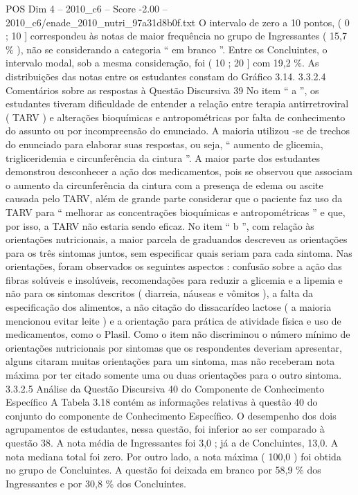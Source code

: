 \begin{textsample}{POS Dim 4 – 2010\_c6 – Score -2.00 – 2010\_c6/enade\_2010\_nutri\_97a31d8b0f.txt}
O intervalo de zero a 10 pontos, ( 0 ; 10 ] correspondeu às notas de maior frequência no grupo de Ingressantes ( 15,7 \% ), não se considerando a categoria “ em branco ”.
Entre os Concluintes, o intervalo modal, sob a mesma consideração, foi ( 10 ; 20 ] com 19,2 \%.
As distribuições das notas entre os estudantes constam do Gráfico 3.14. 3.3.2.4 Comentários sobre as respostas à Questão Discursiva 39 No item “ a ”, os estudantes tiveram dificuldade de entender a relação entre terapia antirretroviral ( TARV ) e alterações bioquímicas e antropométricas por falta de conhecimento do assunto ou por incompreensão do enunciado.
A maioria utilizou -se de trechos do enunciado para elaborar suas respostas, ou seja, “ aumento de glicemia, trigliceridemia e circunferência da cintura ”.
A maior parte dos estudantes demonstrou desconhecer a ação dos medicamentos, pois se observou que associam o aumento da circunferência da cintura com a presença de edema ou ascite causada pelo TARV, além de grande parte considerar que o paciente faz uso da TARV para “ melhorar as concentrações bioquímicas e antropométricas ” e que, por isso, a TARV não estaria sendo eficaz.
No item “ b ”, com relação às orientações nutricionais, a maior parcela de graduandos descreveu as orientações para os três sintomas juntos, sem especificar quais seriam para cada sintoma.
Nas orientações, foram observados os seguintes aspectos : confusão sobre a ação das fibras solúveis e insolúveis, recomendações para reduzir a glicemia e a lipemia e não para os sintomas descritos ( diarreia, náuseas e vômitos ), a falta da especificação dos alimentos, a não citação do dissacarídeo lactose ( a maioria mencionou evitar leite ) e a orientação para prática de atividade física e uso de medicamentos, como o Plasil.
Como o item não discriminou o número mínimo de orientações nutricionais por sintomas que os respondentes deveriam apresentar, alguns citaram muitas orientações para um sintoma, mas não receberam nota máxima por ter citado somente uma ou duas orientações para o outro sintoma. 3.3.2.5 Análise da Questão Discursiva 40 do Componente de Conhecimento Específico A Tabela 3.18 contém as informações relativas à questão 40 do conjunto do componente de Conhecimento Específico.
O desempenho dos dois agrupamentos de estudantes, nessa questão, foi inferior ao ser comparado à questão 38.
A nota média de Ingressantes foi 3,0 ; já a de Concluintes, 13,0.
A nota mediana total foi zero.
Por outro lado, a nota máxima ( 100,0 ) foi obtida no grupo de Concluintes.
A questão foi deixada em branco por 58,9 \% dos Ingressantes e por 30,8 \% dos Concluintes.

\end{textsample}
